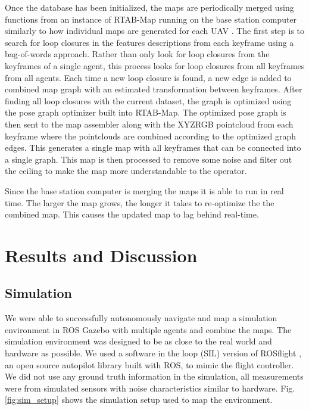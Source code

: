 \documentclass[letterpaper, 10 pt, conference]{ieeeconf}  %
\begin{document}
Once the database has been initialized, the maps are periodically merged using functions from an instance of RTAB-Map running on the base station computer similarly to how individual maps are generated for each UAV \cite{Labbe2011}\cite{Labbe2013}\cite{Labbe2019}. The first step is to search for loop closures in the features descriptions from each keyframe using a bag-of-words approach. Rather than only look for loop closures from the keyframes of a single agent, this process looks for loop closures from all keyframes from all agents. Each time a new loop closure is found, a new edge is added to combined map graph with an estimated transformation between keyframes. After finding all loop closures with the current dataset, the graph is optimized using the pose graph optimizer built into RTAB-Map. The optimized pose graph is then sent to the map assembler along with the XYZRGB pointcloud from each keyframe where the pointclouds are combined according to the optimized graph edges. This generates a single map with all keyframes that can be connected into a single graph. This map is then processed to remove some noise and filter out the ceiling to make the map more understandable to the operator.

Since the base station computer is merging the maps it is able to run in real time. The larger the map grows, the longer it takes to re-optimize the the combined map. This causes the updated map to lag behind real-time.
\section{Results and Discussion}\label{results}

\subsection{Simulation}

We were able to successfully autonomously navigate and map a simulation environment in ROS Gazebo \cite{Gazebo} with multiple agents and combine the maps. The simulation environment was designed to be as close to the real world and hardware as possible. We used a software in the loop (SIL) version of ROSflight \cite{Jackson2016a}, an open source autopilot library built with ROS, to mimic the flight controller. We did not use any ground truth information in the simulation, all measurements were from simulated sensors with noise characteristics similar to hardware. Fig. \ref{fig:sim_setup} shows the simulation setup used to map the environment.
\end{document}
